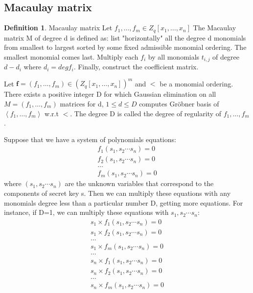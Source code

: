 \documentclass[a4paper]{article}
\theoremstyle{definition}
\newtheorem{definition}{Definition}[section]
\theoremstyle{remark}
\begin{document}
\subsection{Macaulay matrix}
\begin{definition}{Macaulay matrix}
Let $f _ { 1 } , \ldots , f _ { m } \in Z _ { q } \left[ x _ { 1 } , \ldots , x _ { n } \right]$
The Macaulay matrix M of degree d is defined as: list "horizontally" all the degree d monomials from smallest to largest sorted by some fixed admissible monomial ordering. The smallest monomial comes last. Multiply each $f_{i}$ by all monomials $t_{i,j}$ of degree $d-d_{i}$ where $d_{i} = deg{f_{i}}$. Finally, construct the coefficient matrix.
\end{definition}
\begin{theorem}
Let $\mathbf { f } = \left( f _ { 1 } , \dots , f _ { m } \right) \in \left( Z _ { q } \left[ x _ { 1 } , \ldots , x _ { n } \right] \right) ^ { m }$
and $<$ be a monomial ordering. There exists a positive integer D for which
Gaussian elimination on all $M = \left( f _ { 1 } , \ldots , f _ { m } \right)$ matrices
for d, $1\le d\le D$ computes Gr\"{o}bner basis of $\left\langle f _ { 1 } , \dots , f _ { m } \right\rangle$
w.r.t $<$. The degree D is called the degree of regularity of $f _ { 1 } , \ldots , f _ { m }$.
\end{theorem}
Suppose that we have a system of polynomials equations:
\begin{gather*}
 f _ { 1 }(s_{1}, s_{2}\cdots s_{n})=0 \\
  f _ { 2 }(s_{1}, s_{2}\cdots s_{n})=0\\ 
  \ldots \\ 
 f _ { m }(s_{1}, s_{2}\cdots s_{n})=0
 \end{gather*}
 where $(s_{1}, s_{2}\cdots s_{n})$ are the unknown variables that correspond to the components of secret key s. Then we can multiply these equations with any monomials degree less than a particular number D, getting more equations. For instance, if D=1, we can multiply these equations with $s_{1}, s_{2}\cdots s_{n}$:
   \begin{gather*}
 s_{1}\times f _ { 1 }(s_{1}, s_{2}\cdots s_{n})=0 \\
   s_{1}\times f _ { 2 }(s_{1}, s_{2}\cdots s_{n})=0\\ 
  \ldots \\ 
  s_{1}\times f _ { m }(s_{1}, s_{2}\cdots s_{n})=0\\
   \ldots \\
    s_{n}\times f _ { 1 }(s_{1}, s_{2}\cdots s_{n})=0 \\
   s_{n}\times f _ { 2 }(s_{1}, s_{2}\cdots s_{n})=0\\ 
  \ldots \\ 
  s_{n}\times f _ { m }(s_{1}, s_{2}\cdots s_{n})=0\\
 \end{gather*}
\end{document}
